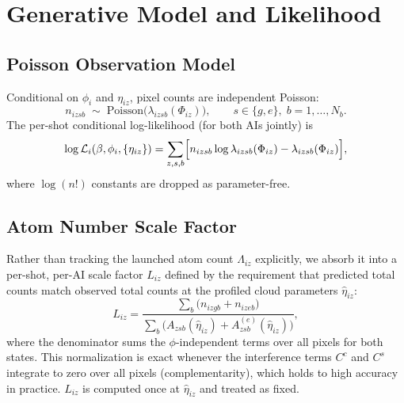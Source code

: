 \documentclass[11pt,a4paper]{article}
\newcommand{\Lcal}{\mathcal{L}}
\begin{document}
\section{Generative Model and Likelihood}

\subsection{Poisson Observation Model}

Conditional on $\phi_i$ and $\eta_{iz}$, pixel counts are independent Poisson:
\begin{equation}
  n_{izsb} \;\sim\; \mathrm{Poisson}\!\bigl(\lambda_{izsb}(\Phi_{iz})\bigr),
  \qquad s \in \{g,e\},\; b = 1,\ldots,N_b.
  \label{eq:poisson}
\end{equation}
The per-shot conditional log-likelihood (for both AIs jointly) is
\begin{equation}
  \log\Lcal_i(\beta,\phi_i,\{\eta_{iz}\})
  = \sum_{z,s,b}
    \Bigl[
      n_{izsb} \log \lambda_{izsb}(\Phi_{iz})
      - \lambda_{izsb}(\Phi_{iz})
    \Bigr],
  \label{eq:cond_ll}
\end{equation}
where $\log(n!)$ constants are dropped as parameter-free.

\subsection{Atom Number Scale Factor}
\label{sec:atom_number}

Rather than tracking the launched atom count $\Lambda_{iz}$ explicitly, we
absorb it into a per-shot, per-AI scale factor $L_{iz}$ defined by the
requirement that predicted total counts match observed total counts at the
profiled cloud parameters $\hat\eta_{iz}$:
\begin{equation}
  L_{iz}
  = \frac{\displaystyle\sum_b \bigl(n_{izgb} + n_{izeb}\bigr)}
         {\displaystyle\sum_b \bigl(A_{zsb}(\hat\eta_{iz})
                              + A_{zsb}^{(e)}(\hat\eta_{iz})\bigr)},
  \label{eq:Lfix}
\end{equation}
where the denominator sums the $\phi$-independent terms over all pixels for
both states.  This normalization is exact whenever the interference terms
$C^c$ and $C^s$ integrate to zero over all pixels (complementarity), which
holds to high accuracy in practice.  $L_{iz}$ is computed once at
$\hat\eta_{iz}$ and treated as fixed.
\end{document}
